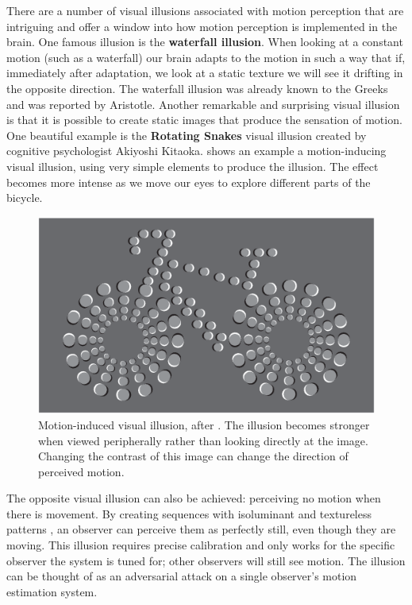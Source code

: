 There are a number of visual illusions associated with motion perception that are intriguing and offer a window into how motion perception is implemented in the brain. One famous illusion is the {\bf waterfall illusion}. When looking at a constant motion (such as a waterfall) our brain adapts to the motion in such a way that if, immediately after adaptation, we look at a static texture we will see it drifting in the opposite direction. The waterfall illusion was already known to the Greeks and was reported by Aristotle. Another remarkable and surprising visual illusion is that it is possible to create static images that produce the sensation of motion. One beautiful example is the {\bf Rotating Snakes} visual illusion created by cognitive psychologist Akiyoshi Kitaoka. \Fig{\ref{fig:motion_illusion}} shows an example a motion-inducing visual illusion, using very simple elements to produce the illusion. The effect becomes more intense as we move our eyes to explore different parts of the bicycle.  



\begin{figure}[t]
    \centerline{
        \includegraphics[width=1\linewidth]{figures/optical_flow/moving_bike.eps}
    }
    \caption{Motion-induced visual illusion, after \cite{Murakami2010}. The illusion becomes stronger
        when viewed peripherally rather than looking directly at the image. Changing the contrast of this image can change the direction of perceived motion.}
    \label{fig:motion_illusion}
\end{figure}

The opposite visual illusion can also be achieved: perceiving no motion when there is movement. By creating sequences with isoluminant and textureless patterns \cite{Sperling2017}, an observer can perceive them as perfectly still, even though they are moving. This illusion requires precise calibration and only works for the specific observer the system is tuned for; other observers will still see motion. The illusion can be thought of as an adversarial attack on a single observer's motion estimation system.

